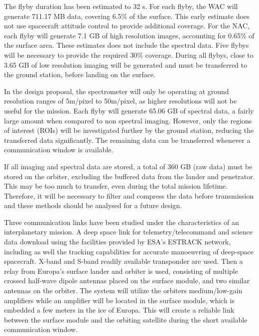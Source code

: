 The flyby duration has been estimated to 32 s. For each flyby, the WAC will generate 711.17 MB data, covering 6.5\% of the surface. This early estimate does not use spacecraft attitude control to provide additional coverage. For the NAC, each flyby will generate 7.1 GB of high resolution images, accounting for 0.65\% of the surface area. These estimates does not include the spectral data. Five flybys will be necessary to provide the required 30\% coverage. During all flybys, close to 3.65 GB of low resolution imaging will be generated and must be transferred to the ground station, before landing on the surface.

In the design proposal, the spectrometer will only be operating at ground resolution ranges of 5m/pixel to 50m/pixel, as higher resolutions will not be useful for the mission. Each flyby will generate 65.06 GB of spectral data, a fairly large amount when compared to non spectral imaging. However, only the regions of interest (ROIs) will be investigated further by the ground station, reducing the transferred data significantly. The remaining data can be transferred whenever a communication window is available.

If all imaging and spectral data are stored, a total of 360 GB (raw data) must be stored on the orbiter,  excluding the buffered data from the lander and penetrator. This may be too much to transfer, even during the total mission lifetime. Therefore, it will be necessary to filter and compress the data before transmission and these methods should be analysed for a future design.


Three communication links have been studied under the characteristics of an interplanetary mission. A deep space link for telemetry/telecommand and science data download using the facilities provided by ESA's ESTRACK network, including as well the tracking capabilities for accurate manoeuvring of deep-space spacecraft. X-band and S-band readily available transponder are used. Then a relay from Europa's surface lander and orbiter is used, consisting of multiple crossed half-wave dipole antennas placed on the surface module, and two similar antennas on the orbiter. The system will utilize the orbiters medium/low-gain amplifiers while an amplifier will be located in the surface module, which is embedded a few meters in the ice of Europa. This will create a reliable link between the surface module and the orbiting satellite during the short available communication window.\\

